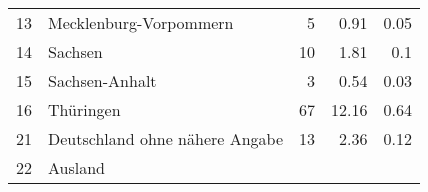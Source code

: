\begin{longtable}{lXrrr}
     13 &
     \multicolumn{1}{X}{ Mecklenburg-Vorpommern   } &


       \num{5} &
       \num[round-mode=places,round-precision=2]{0.91} &
         \num[round-mode=places,round-precision=2]{0.05} \\

     14 &
     \multicolumn{1}{X}{ Sachsen   } &


       \num{10} &
       \num[round-mode=places,round-precision=2]{1.81} &
         \num[round-mode=places,round-precision=2]{0.1} \\

     15 &
     \multicolumn{1}{X}{ Sachsen-Anhalt   } &


       \num{3} &
       \num[round-mode=places,round-precision=2]{0.54} &
         \num[round-mode=places,round-precision=2]{0.03} \\

     16 &
     \multicolumn{1}{X}{ Thüringen   } &


       \num{67} &
       \num[round-mode=places,round-precision=2]{12.16} &
         \num[round-mode=places,round-precision=2]{0.64} \\

     21 &
     \multicolumn{1}{X}{ Deutschland ohne nähere Angabe   } &


       \num{13} &
       \num[round-mode=places,round-precision=2]{2.36} &
         \num[round-mode=places,round-precision=2]{0.12} \\

     22 &
     \multicolumn{1}{X}{ Ausland   } &



\end{longtable}
